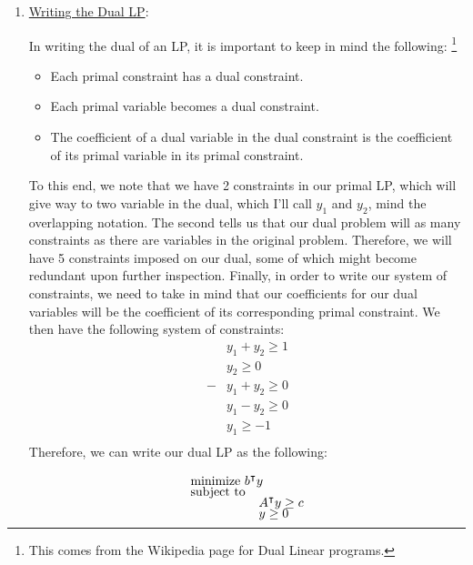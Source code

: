 \begin{solution}
\begin{enumerate}
        \item \underline{Writing the Dual LP}:

        \hop
        In writing the dual of an LP, it is important to keep in mind the following: \footnote{This comes from the Wikipedia page for Dual Linear programs.}
        \begin{itemize}
            \item Each primal constraint has a dual constraint.
            \item Each primal variable becomes a dual constraint.
            \item The coefficient of a dual variable in the dual constraint is the coefficient of its primal variable in its primal constraint. 
        \end{itemize}
        To this end, we note that we have 2 constraints in our primal LP, which will give way to two variable in the dual, which I'll call $y_1$ and $y_2$, mind the overlapping notation. The second tells us that our dual problem will as many constraints as there are variables in the original problem. Therefore, we will have 5 constraints imposed on our dual, some of which might become redundant upon further inspection. Finally, in order to write our system of constraints, we need to take in mind that our coefficients for our dual variables will be the coefficient of its corresponding primal constraint. We then have the following system of constraints:
        \begin{align*}
            &y_1 + y_2 \geq 1   \\[-1.5ex]
            &y_2 \geq 0         \\[-1.5ex]
            -&y_1 + y_2 \geq 0  \\[-1.5ex]
            &y_1 - y_2 \geq 0   \\[-1.5ex]
            &y_1 \geq -1        \\[-1.5ex]
        \end{align*}
        Therefore, we can write our dual LP as the following:
        \begin{multicols}{2}

            \begin{align*}
            &\text{minimize } b\T y     \\[-1.5ex]
            &\text{subject to}          \\[-1.5ex]
            &\hspace{19mm} A\T y \geq c \\[-1.5ex]
            &\hspace{19mm} y \geq 0     \\[-1.5ex]
            \end{align*}
            

\end{multicols}
\end{enumerate}
\end{solution}
